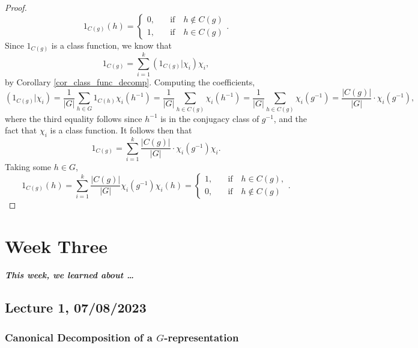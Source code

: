 \documentclass[a4paper]{report}
\theoremstyle{definition}
\theoremstyle{remark}
\theoremstyle{proposition}
\theoremstyle{conjecture}
\theoremstyle{lemma}
\theoremstyle{corollary}
\theoremstyle{exercise}
\theoremstyle{example}
\begin{document}
\begin{proof}
          $$1_{C(g)}(h) = \begin{cases}
               0,\quad &\text{if}\quad h\not\in C(g)\\
               1,\quad &\text{if}\quad h \in C(g)
           \end{cases}.$$
           Since $1_{C(g)}$ is a class function, we know that 
           $$1_{C(g)} = \sum_{i=1}^k (1_{C(g)}\vert \chi_i) \chi_i,$$
           by Corollary \ref{cor_class_func_decomp}. 
           Computing the coefficients,
           $$(1_{C(g)}\vert \chi_i) = \frac{1}{\vert G\vert}\sum_{h\in G}1_{C(h)} \chi_i(h^{-1}) = \frac{1}{\vert G \vert} \sum_{h \in C(g)}\chi_i(h^{-1}) = \frac{1}{\vert G \vert} \sum_{h\in C(g)} \chi_i(g^{-1})=\frac{\vert C(g)\vert}{\vert G \vert} \cdot \chi_i(g^{-1}),$$
           where the third equality follows since $h^{-1}$ is in the 
           conjugacy class of $g^{-1}$, and the fact that $\chi_i$ is a 
           class function. It follows then that 
           $$1_{C(g)} = \sum_{i=1}^k \frac{\vert C(g)\vert}{\vert G \vert} \cdot \chi_i(g^{-1}) \chi_i.$$
           Taking some $h\in G$, 
           $$1_{C(g)}(h) = \sum_{i=1}^k \frac{\vert C(g)\vert}{\vert G \vert} \chi_i(g^{-1})\chi_i(h) =
           \begin{cases}
               1,\quad &\text{if} \quad h \in C(g),\\
               0, \quad &\text{if} \quad h\not\in C(g)
           \end{cases}.$$
\end{proof}

\chapter{Week Three}

\paragraph{This week, we learned about \ldots} 

\section{Lecture 1, 07/08/2023}

\subsection{Canonical Decomposition of a $G$-representation}
\end{document}
